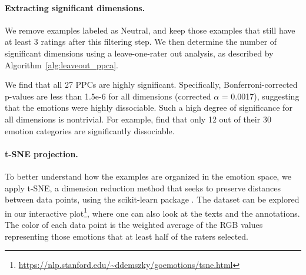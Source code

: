 \documentclass[11pt,a4paper]{article}
\begin{document}
\paragraph{Extracting significant dimensions.} We remove examples labeled as Neutral, and keep those examples that still have at least 3 ratings after this filtering step. We then determine the number of significant dimensions using a leave-one-rater out analysis, as described by Algorithm~\ref{alg:leaveout_ppca}.

We find that all 27 PPCs are highly significant. Specifically, Bonferroni-corrected p-values are less than 1.5e-6 for all dimensions (corrected $\alpha$ = 0.0017), suggesting that the emotions were highly dissociable. Such a high degree of significance for all dimensions is nontrivial. For example, \citet{cowen2019primacy} find that only 12 out of their 30 emotion categories are significantly dissociable.


\paragraph{t-SNE projection.} To better understand how the examples are organized in the emotion space, we apply t-SNE, a dimension reduction method that seeks to preserve distances between data points, using the scikit-learn package \citep{scikit-learn}. The dataset can be explored in our interactive plot\footnote{\url{https://nlp.stanford.edu/~ddemszky/goemotions/tsne.html}}, where one can also look at the texts and the annotations. The color of each data point is the weighted average of the RGB values representing those emotions that at least half of the raters selected.
\end{document}
